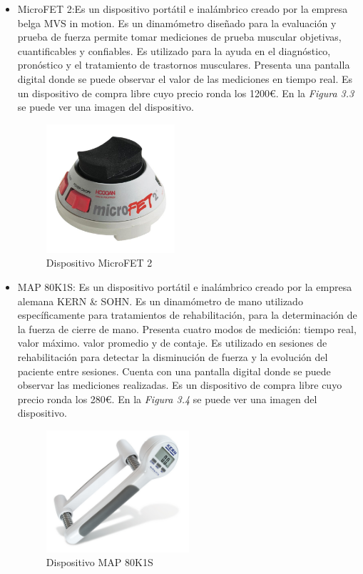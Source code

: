\begin{itemize}
    \item MicroFET 2:Es un dispositivo portátil e inalámbrico creado por la empresa belga MVS in motion. Es un dinamómetro diseñado para la evaluación y prueba de fuerza permite tomar mediciones de prueba muscular objetivas, cuantificables y confiables.
    Es utilizado para la ayuda en el diagnóstico, pronóstico y el tratamiento de trastornos musculares. Presenta una pantalla digital donde se puede observar el valor de las mediciones en tiempo real. 
    Es un dispositivo de compra libre cuyo precio ronda los 1200€. En la \textit{Figura 3.3} se puede ver una imagen del dispositivo.
    \begin{figure}[h]
        \centering
        \includegraphics[width=0.45\textwidth]{img/MicroFET 2.jpg}
        \caption{Dispositivo MicroFET 2}
        \label{fig:activforce}
    \end{figure}
    
    \item MAP 80K1S: Es un dispositivo portátil e inalámbrico creado por la empresa alemana KERN \& SOHN. Es un dinamómetro de mano utilizado específicamente para tratamientos de rehabilitación, para la determinación de la fuerza de cierre de mano.
    Presenta cuatro modos de medición: tiempo real, valor máximo. valor promedio y de contaje. 
    Es utilizado en sesiones de rehabilitación para detectar la disminución de fuerza y la evolución del paciente entre sesiones. Cuenta con una pantalla digital donde se puede observar las mediciones realizadas.
    Es un dispositivo de compra libre cuyo precio ronda los 280€. En la \textit{Figura 3.4} se puede ver una imagen del dispositivo.
      \begin{figure}[h]
        \centering
        \includegraphics[width=0.5\textwidth]{img/MAP-80K1S.jpg}
        \caption{Dispositivo MAP 80K1S}
        \label{fig:activforce}
    \end{figure}
    

\end{itemize}
